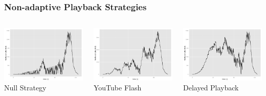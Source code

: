 \documentclass{beamer}
\begin{document}
\begin{frame}
	\frametitle{Non-adaptive Playback Strategies}
	\begin{columns}[T]
			\centering
			\includegraphics[width=0.75\columnwidth]{../../chapters/03-streaming/images/R-bufferlevel-stall.pdf}\\
			Null Strategy

			\includegraphics[width=0.75\columnwidth]{../../chapters/03-streaming/images/R-bufferlevel-flash.pdf}\\
			YouTube Flash

			\centering
			\includegraphics[width=0.75\columnwidth]{../../chapters/03-streaming/images/R-bufferlevel-startdelay.pdf}\\
			Delayed Playback


\end{columns}
\end{frame}
\end{document}

